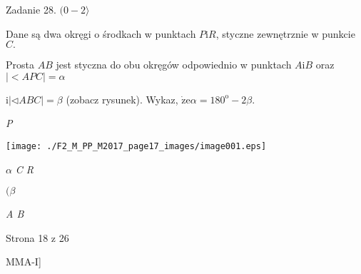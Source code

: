 \documentclass[a4paper,12pt]{article}
\begin{document}
Zadanie 28. $(0-2\rangle$

Dane są dwa okręgi o środkach w punktach $P \mathrm{i} R$, styczne zewnętrznie w punkcie $C.$

Prosta $AB$ jest styczna do obu okręgów odpowiednio w punktach $A \mathrm{i}B$ oraz $|<APC|=\alpha$

$\mathrm{i}|\triangleleft ABC|=\beta$ (zobacz rysunek). Wykaz, $\dot{\mathrm{z}}\mathrm{e}\alpha=180^{\mathrm{o}}-2\beta.$

{\it P}
\begin{center}
\texttt{[image: ./F2\_M\_PP\_M2017\_page17\_images/image001.eps]}
\end{center}
$\alpha$  {\it C  R}

$(\beta$

{\it A  B}

Strona 18 z 26

MMA-I]
\end{document}
